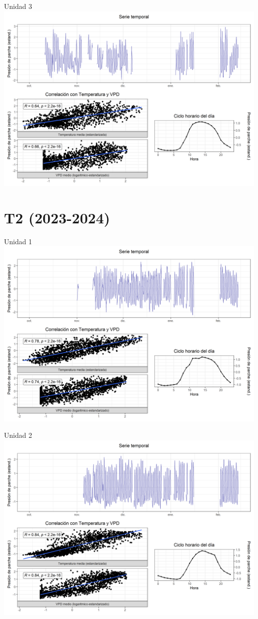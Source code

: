 \documentclass[
  letterpaper,
  DIV=11,
  numbers=noendperiod]{scrreprt}
\begin{document}
Unidad 3
\includegraphics{figuras/04_turgor_unidad/2023_2024_La_Esperanza_T1_Unidad_3.png}

\chapter{T2 (2023-2024)}

Unidad 1
\includegraphics{figuras/04_turgor_unidad/2023_2024_La_Esperanza_T2_Unidad_1.png}

Unidad 2
\includegraphics{figuras/04_turgor_unidad/2023_2024_La_Esperanza_T2_Unidad_2.png}
\end{document}
